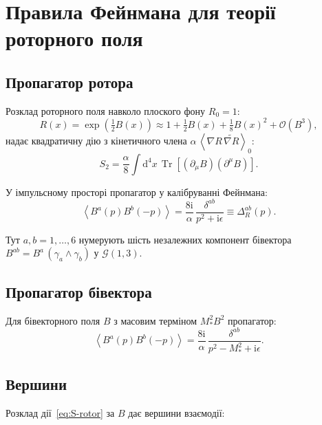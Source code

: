 \documentclass[11pt,a4paper]{article}
\numberwithin{equation}{section}
\theoremstyle{plain}
\theoremstyle{definition}
\theoremstyle{remark}
\DeclareMathOperator{\Tr}{Tr}
\newcommand{\dd}{\mathrm{d}}
\newcommand{\ii}{\mathrm{i}}
\newcommand{\avg}[1]{\left\langle #1 \right\rangle}
\newcommand{\Cl}{\mathcal{G}}               %
\newcommand{\rev}[1]{\widetilde{#1}}        %
\newcommand{\grade}[2]{\left\langle #1 \right\rangle_{#2}}
\begin{document}
\vspace{1em}

\section{Правила Фейнмана для теорії роторного поля}\label{sec:feynman}

\subsection{Пропагатор ротора}

Розклад роторного поля навколо плоского фону $R_0=1$:
\begin{equation}
R(x) = \exp\left(\tfrac12 B(x)\right) \approx 1 + \tfrac12 B(x) + \tfrac18 B(x)^2 + \mathcal{O}(B^3),
\label{eq:R-expansion}
\end{equation}
надає квадратичну дію з кінетичного члена $\alpha\,\grade{\nabla R\,\rev{\nabla R}}{0}$:
\begin{equation}
S_2 = \frac{\alpha}{8}\int \dd^4x\,\Tr[(\partial_\mu B)(\partial^\mu B)].
\label{eq:S2-rotor}
\end{equation}

У імпульсному просторі пропагатор у калібруванні Фейнмана:
\begin{equation}
\avg{B^a(p)B^b(-p)} = \frac{8\ii}{\alpha}\,\frac{\delta^{ab}}{p^2+\ii\epsilon} \equiv \Delta_R^{ab}(p).
\label{eq:prop-rotor}
\end{equation}

Тут $a,b=1,\ldots,6$ нумерують шість незалежних компонент бівектора $B^{ab}=B^a\,(\gamma_a\wedge\gamma_b)$ у $\Cl(1,3)$.

\subsection{Пропагатор бівектора}

Для бівекторного поля $B$ з масовим терміном $M_*^2 B^2$ пропагатор:
\begin{equation}
\avg{B^a(p)B^b(-p)} = \frac{8\ii}{\alpha}\,\frac{\delta^{ab}}{p^2 - M_*^2 + \ii\epsilon}.
\label{eq:prop-bivector}
\end{equation}

\subsection{Вершини}

Розклад дії~\eqref{eq:S-rotor} за $B$ дає вершини взаємодії:
\end{document}
